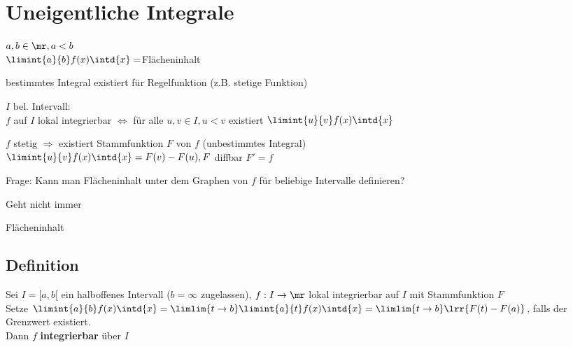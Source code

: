 \chapter{Uneigentliche Integrale}

$a,b\in\mr, a<b$\\
$\limint{a}{b}f(x)\intd{x}=$Flächeninhalt


bestimmtes Integral existiert für Regelfunktion (z.B. stetige Funktion)

$I$ bel. Intervall:\\
$f$ auf $I$ lokal integrierbar $\Leftrightarrow$ für alle $u,v\in I, u<v$ existiert $\limint{u}{v}f(x)\intd{x}$

$f$ stetig $\Rightarrow$ existiert Stammfunktion $F$ von $f$ (unbestimmtes Integral)\\
$\limint{u}{v}f(x)\intd{x}=F(v)-F(u), F$ diffbar $F'=f$

Frage: Kann man Flächeninhalt unter dem Graphen von $f$ für beliebige Intervalle definieren?

Geht nicht immer


 Flächeninhalt

\section{Definition}
		\item Sei $I=[a,b[$ ein halboffenes Intervall ($b=\infty$ zugelassen), $f:I\rightarrow\mr$ lokal integrierbar auf $I$ mit Stammfunktion $F$\\
			Setze $\limint{a}{b}f(x)\intd{x}=\limlim{t\rightarrow b}\limint{a}{t}f(x)\intd{x}=\limlim{t\rightarrow b}\lrr{F(t)-F(a)}$, falls der Grenzwert existiert.\\
			Dann $f$ \textbf{integrierbar} über $I$
			
